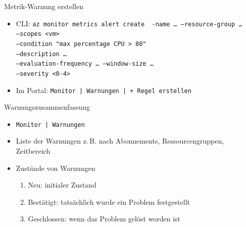 \begin{flashcard}[Definition]{Metrik-Warnung erstellen}
    \begin{itemize}
        \item CLI:\newline
            \texttt{az monitor metrics alert create \
            -name \ldots\
            --resource-group \ldots\\
            --scopes <vm>\\
            --condition "max percentage CPU > 80"\\
            --description \ldots\\
            --evaluation-frequency \ldots\ --window-size \ldots\\
            --severity <0-4>}
        \item Im Portal:\newline
            \texttt{Monitor | Warnungen | + Regel erstellen}
    \end{itemize}
    \vspace*{\stretch{1}}
\end{flashcard}


\begin{flashcard}[Definition]{Warnungszusammenfassung}
    \begin{itemize}
        \item \texttt{Monitor | Warnungen}
        \item Liste der Warnungen z.\,B. nach Abonnements, Ressourcengruppen, Zeitbereich
        \item Zustände von Warnungen
            \begin{enumerate}
                \item Neu: initialer Zustand
                \item Bestätigt: tatsächlich wurde ein Problem festgestellt
                \item Geschlossen: wenn das Problem gelöst worden ist
            \end{enumerate}
    \end{itemize}
\end{flashcard}



